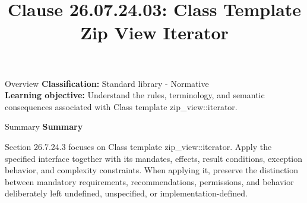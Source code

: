 \documentclass[10pt,letterpaper]{article}
\title{Clause 26.07.24.03: Class Template Zip View Iterator}
\author{}
\date{}
\begin{document}
\maketitle
\begin{CornellOverviewBox}{Overview}
\textbf{Classification:} Standard library - Normative\\[2pt]
\textbf{Learning objective:} Understand the rules, terminology, and semantic consequences associated with Class template zip\_view::iterator.
\end{CornellOverviewBox}\begin{CornellSummaryBox}{Summary}
{\sffamily\bfseries\color{Accent} Summary}\par\vspace{3pt}Section 26.7.24.3 focuses on Class template zip\_view::iterator. Apply the specified interface together with its mandates, effects, result conditions, exception behavior, and complexity constraints. When applying it, preserve the distinction between mandatory requirements, recommendations, permissions, and behavior deliberately left undefined, unspecified, or implementation-defined.
\end{CornellSummaryBox}
\end{document}
